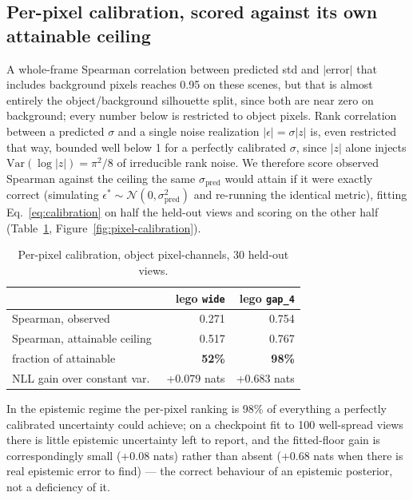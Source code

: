 \documentclass[letterpaper,10pt,conference]{ieeeconf}
\begin{document}
\subsection{Per-pixel calibration, scored against its own attainable ceiling}

A whole-frame Spearman correlation between predicted std and $|$error$|$
that includes background pixels reaches 0.95 on these scenes, but that is
almost entirely the object/background silhouette split, since both are
near zero on background; every number below is restricted to object
pixels. Rank correlation between a predicted $\sigma$ and a single noise
realization $|\epsilon|=\sigma|z|$ is, even restricted that way, bounded
well below 1 for a perfectly calibrated $\sigma$, since $|z|$ alone injects
$\mathrm{Var}(\log|z|)=\pi^2/8$ of irreducible rank noise. We therefore
score observed Spearman against the ceiling the same $\sigma_{\mathrm
{pred}}$ would attain if it were exactly correct (simulating
$\epsilon^\ast\sim\mathcal N(0,\sigma_{\mathrm{pred}}^2)$ and re-running the
identical metric), fitting Eq.~\eqref{eq:calibration} on half the held-out
views and scoring on the other half (Table~\ref{tab:pixel-calibration},
Figure~\ref{fig:pixel-calibration}).

\begin{table}[t]
    \centering
    \caption{Per-pixel calibration, object pixel-channels, 30 held-out
    views.}
    \label{tab:pixel-calibration}
    \begin{tabular}{@{}lrr@{}}
        \toprule
         & lego \texttt{wide} & lego \texttt{gap\_4} \\
        \midrule
        Spearman, observed          & 0.271 & 0.754 \\
        Spearman, attainable ceiling & 0.517 & 0.767 \\
        fraction of attainable       & \textbf{52\%} & \textbf{98\%} \\
        NLL gain over constant var.\ & +0.079 nats & +0.683 nats \\
        \bottomrule
    \end{tabular}
\end{table}

In the epistemic regime the per-pixel ranking is 98\% of everything a
perfectly calibrated uncertainty could achieve; on a checkpoint fit to 100
well-spread views there is little epistemic uncertainty left to report,
and the fitted-floor gain is correspondingly small (+0.08 nats) rather than
absent (+0.68 nats when there is real epistemic error to find) --- the
correct behaviour of an epistemic posterior, not a deficiency of it.
\end{document}
